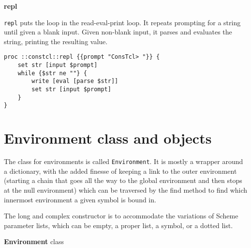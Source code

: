 \documentclass{report}
\begin{document}
\textbf{repl}


\texttt{repl} puts the loop in the read-eval-print loop. It repeats prompting for a string until given a blank input. Given non-blank input, it parses and evaluates the string, printing the resulting value.

\noindent\makebox[\linewidth]{\rule{\linewidth}{0.4pt}}
\begin{lstlisting}
proc ::constcl::repl {{prompt "ConsTcl> "}} {
    set str [input $prompt]
    while {$str ne ""} {
        write [eval [parse $str]]
        set str [input $prompt]
    }
}
\end{lstlisting}
\noindent\makebox[\linewidth]{\rule{\linewidth}{0.4pt}}
\section{Environment class and objects}
\label{environment-class-and-objects}

The class for environments is called \texttt{Environment}. It is mostly a wrapper around a dictionary, with the added finesse of keeping a link to the outer environment (starting a chain that goes all the way to the global environment and then stops at the null environment) which can be traversed by the find method to find which innermost environment a given symbol is bound in.


The long and complex constructor is to accommodate the variations of Scheme parameter lists, which can be empty, a proper list, a symbol, or a dotted list.


\textbf{Environment} class
\end{document}
